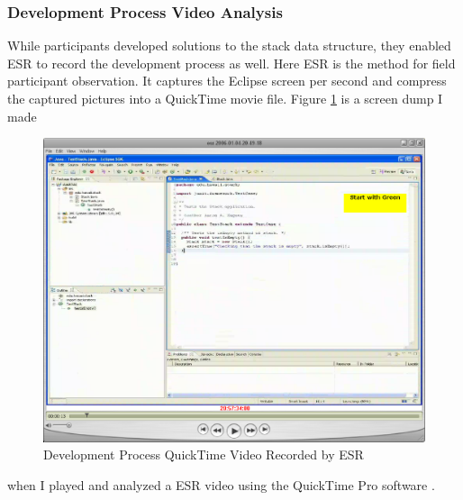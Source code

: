 \subsubsection{Development Process Video Analysis}
While participants developed solutions to the stack data structure,
they enabled ESR to record the development process as well. Here ESR
is the method for field participant observation. It captures the
Eclipse screen per second and compress the captured pictures into a
QuickTime movie file. Figure \ref{fig:EsrVideo} is a screen dump I made 
\begin{figure}[htbp]
  \centering
  \includegraphics[width=1.0\textwidth]{figs/ESR-Video.eps}
  \caption{Development Process QuickTime Video Recorded by ESR}\label{fig:EsrVideo}
\end{figure}
when I played and analyzed a ESR video using the QuickTime Pro software
\cite{QuickTime}.

